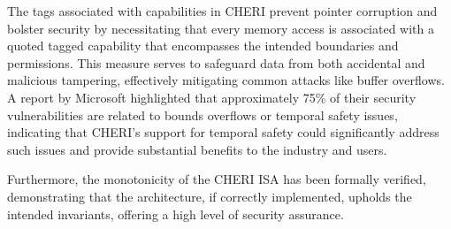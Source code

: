 The tags associated with capabilities in CHERI prevent pointer corruption and bolster security by necessitating that every memory access is 
associated with a quoted tagged capability that encompasses the intended boundaries and permissions. This measure serves to safeguard data 
from both accidental and malicious tampering, effectively mitigating common attacks like buffer overflows. A report by Microsoft\cite{noauthor_msrc-security-researchpapers2020security_nodate} highlighted that 
approximately 75\% of their security vulnerabilities are related to bounds overflows or temporal safety issues, indicating that CHERI's support for temporal safety 
could significantly address such issues and provide substantial benefits to the industry and users.
\newline

Furthermore, the monotonicity of the CHERI ISA\cite{watson_capability_nodate} has been formally verified\cite{zaliva_formal_2024}, demonstrating that the architecture, if correctly implemented, upholds the 
intended invariants, offering a high level of security assurance.
\newline

